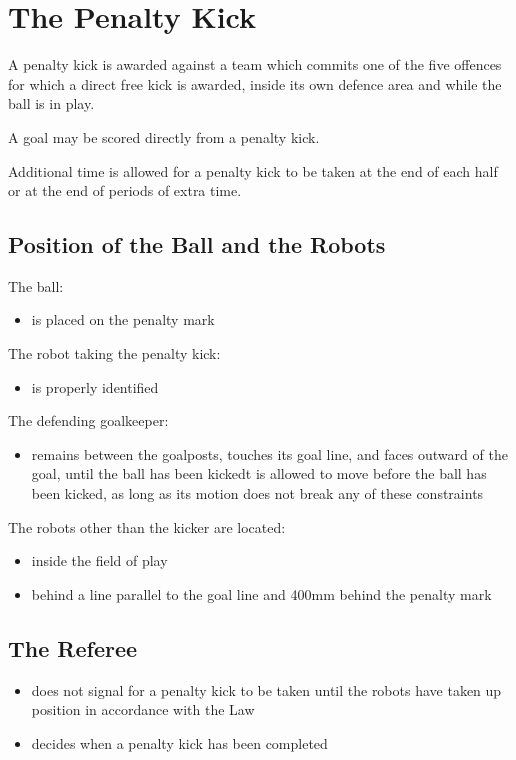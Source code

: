 \section{The Penalty Kick}\label{sec:penalty-kick}

A penalty kick is awarded against a team which commits one of the five offences for which a direct free kick is awarded, inside its own defence area and while the ball is in play.

A goal may be scored directly from a penalty kick.

Additional time is allowed for a penalty kick to be taken at the end of each half or at the end of periods of extra time.

\subsection{Position of the Ball and the Robots}
The ball:

\begin{itemize}
\item is placed on the penalty mark
\end{itemize}

The robot taking the penalty kick:

\begin{itemize}
\item is properly identified
\end{itemize}

The defending goalkeeper:

\begin{itemize}
\item remains between the goalposts, touches its goal line, and faces outward of the goal, until the ball has been kickedt is allowed to move before the ball has been kicked, as long as its motion does not break any of these constraints
\end{itemize}

The robots other than the kicker are located:

\begin{itemize}
\item inside the field of play
\item behind a line parallel to the goal line and 400\added{\,}mm behind the penalty mark
\end{itemize}

\subsection{The Referee}
\begin{itemize}
\item does not signal for a penalty kick to be taken until the robots have taken up position in accordance with the Law
\item decides when a penalty kick has been completed
\end{itemize}

